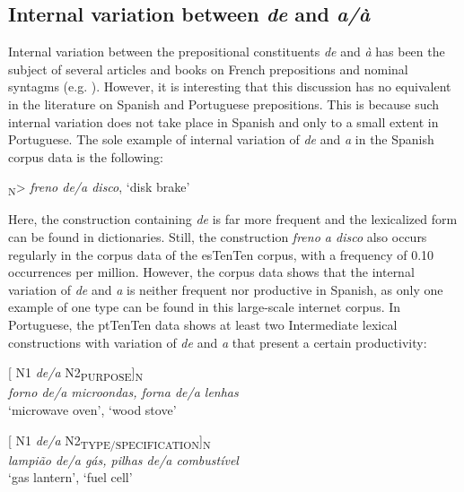 \documentclass[output=paper]{langsci/langscibook}
\begin{document}
\subsection{Internal variation between \textit{de} and \textit{a/à}}

Internal variation between the prepositional constituents \textit{de} and \textit{à} has been the subject of several articles and books on French prepositions and nominal syntagms (e.g. \citealt{Anscombre:1990, Lang:1991, Bosredon:1991, Cadiot:1997}). However, it is interesting that this discussion has no equivalent in the literature on Spanish and Portuguese prepositions. This is because such internal variation does not take place in Spanish and only to a small extent in Portuguese. The sole example of internal variation of \textit{de} and \textit{a} in the Spanish corpus data is the following:

\ea{}\textsubscript{N}>		\textit{freno de/a disco},	`disk brake'\z

Here, the construction containing \textit{de} is far more frequent and the lexicalized form can be found in dictionaries. Still, the construction \textit{freno a disco} also occurs regularly in the corpus data of the esTenTen corpus, with a frequency of 0.10 occurrences per million. However, the corpus data shows that the internal variation of \textit{de} and \textit{a} is neither frequent nor productive in Spanish, as only one example of one type can be found in this large-scale internet corpus. In Portuguese, the ptTenTen data shows at least two Intermediate lexical constructions with variation of \textit{de} and \textit{a} that present a certain productivity:

\begin{exe}\ex\begin{minipage}[t]{0.4\textwidth}    %
[ N1 \textit{de/a} N2\textsubscript{PURPOSE}]\textsubscript{N}\\
\textit{forno de/a microondas,  forna de/a lenhas}\\
`microwave oven',         `wood stove'
\end{minipage}\hfill    %
\begin{minipage}[t]{0.45\textwidth}
[ N1 \textit{de/a} N2\textsubscript{TYPE/SPECIFICATION}]\textsubscript{N}\\
\textit{lampião de/a gás,   pilhas de/a combustível }\\
`gas lantern',           `fuel cell'
\end{minipage}%
\end{exe}
\end{document}
